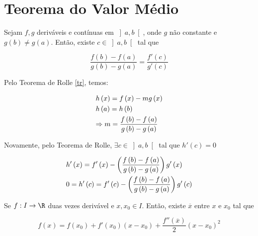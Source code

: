 \documentclass[11pt, oneside, a4paper]{gsm-l}
\begin{document}
\section{Teorema do Valor Médio} \label{sec18}

\begin{lem} \label{lem02}
Sejam $f,g$ deriváveis e contínuas em $\left] {a,b} \right[$, onde $g$ não constante e $g\left( b \right) \ne g\left( a \right)$. Então, existe $c \in \left] {a,b} \right[$ tal que

\[
\frac{{f\left( b \right) - f\left( a \right)}}
{{g\left( b \right) - g\left( a \right)}} = \frac{{f'\left( c \right)}}
{{g'\left( c \right)}}
\]

\end{lem}

\begin{dem}
Pelo Teorema de Rolle \ref{tr}, temos:

\[
\begin{gathered}
h\left( x \right) = f\left( x \right) - mg\left( x \right) \hfill \\
h\left( a \right) = h\left( b \right) \hfill \\
\Rightarrow m = \frac{{f\left( b \right) - f\left( a \right)}}
{{g\left( b \right) - g\left( a \right)}} \hfill \\
\end{gathered}
\]

Novamente, pelo Teorema de Rolle, $\exists c \in \left] {a,b} \right[$ tal que $h'\left( c \right) = 0$

\[
\begin{gathered}
  h'\left( x \right) = f'\left( x \right) - \left( {\frac{{f\left( b \right) - f\left( a \right)}}
{{g\left( b \right) - g\left( a \right)}}} \right)g'\left( x \right) \hfill \\
  0 = h'\left( c \right) = f'\left( c \right) - \left( {\frac{{f\left( b \right) - f\left( a \right)}}
{{g\left( b \right) - g\left( a \right)}}} \right)g'\left( c \right) \hfill \\
\end{gathered}
\]

\end{dem}

\begin{prop}
Se $f:I \to \R$ duas vezes derivável e $x,x_0 \in I$. Então, existe $\overline x$ entre $x$ e $x_0$ tal que

\[
f\left( x \right) = f\left( {x_0 } \right) + f'\left( {x_0 } \right)\left( {x - x_0 } \right) + \frac{{f''\left( {\overline x } \right)}}
{2}\left( {x - x_0 } \right)^2
\]

\end{prop}
\end{document}
